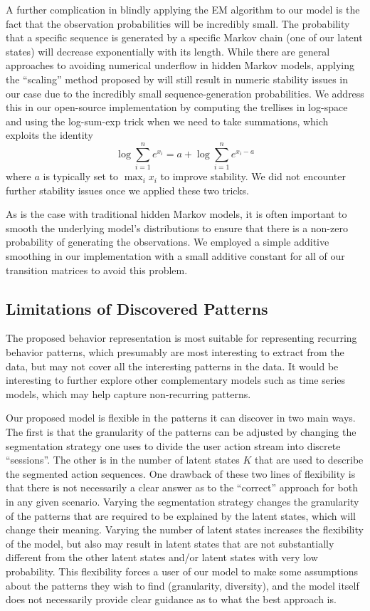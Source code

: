 A further complication in blindly applying the EM algorithm to our model is
the fact that the observation probabilities will be incredibly small. The
probability that a specific sequence is generated by a specific Markov
chain (one of our latent states) will decrease exponentially with its
length. While there are general approaches to avoiding numerical underflow
in hidden Markov models, applying the ``scaling'' method proposed by
\citet{Rabiner:1990:RSR} will still result in numeric stability issues in
our case due to the incredibly small sequence-generation probabilities. We
address this in our open-source implementation by computing the trellises
in log-space and using the log-sum-exp trick when we need to take
summations, which exploits the identity
\begin{equation}
    \log \sum_{i=1}^n e^{x_i} = a + \log \sum_{i=1}^n e^{x_i - a}
\end{equation}
where $a$ is typically set to $\max_i x_i$ to improve stability. We did not
encounter further stability issues once we applied these two tricks.

As is the case with traditional hidden Markov models, it is often important
to smooth the underlying model's distributions to ensure that there is a
non-zero probability of generating the observations. We employed a simple
additive smoothing in our implementation with a small additive constant for
all of our transition matrices to avoid this problem.

\subsection{Limitations of Discovered Patterns}

The proposed behavior representation is most suitable for representing
recurring behavior patterns, which presumably are most interesting 
to extract from the data, but may not cover all the interesting patterns in the data. 
It would be interesting to further explore other complementary models such as
 time series models, which may help capture non-recurring patterns.  
 
Our proposed model is flexible in the patterns it can discover in two main
ways. The first is that the granularity of the patterns can be adjusted by
changing the segmentation strategy one uses to divide the user action
stream into discrete ``sessions''. The other is in the number of latent
states $K$ that are used to describe the segmented action sequences. One
drawback of these two lines of flexibility is that there is not necessarily
a clear answer as to the ``correct'' approach for both in any given
scenario. Varying the segmentation strategy changes the granularity of the
patterns that are required to be explained by the latent states, which will
change their meaning. Varying the number of latent states increases the
flexibility of the model, but also may result in latent states that are not
substantially different from the other latent states and/or latent states
with very low probability. This flexibility forces a user of our model to
make some assumptions about the patterns they wish to find (granularity,
diversity), and the model itself does not necessarily provide clear
guidance as to what the best approach is.

